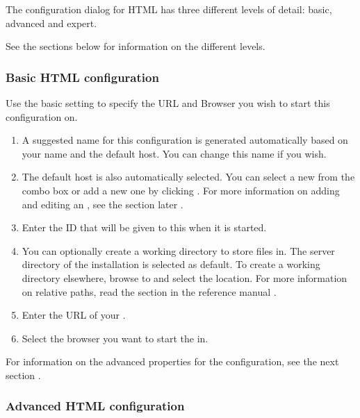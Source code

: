 

The \gdaut{} configuration dialog for HTML has three different levels of detail: basic, advanced and expert. 

See the sections below for information on the different levels. 

\subsubsection{Basic HTML \gdaut{} configuration}

Use the basic setting to specify the URL and Browser you wish to start this \gdaut{} configuration on. 

\begin{enumerate}
\item A suggested name for this \gdaut{} configuration is generated automatically based on your \gdaut{} name and the default \gdagent{} host. You can change this name if you wish. 
\item The default \gdagent host is also automatically selected. You can select a new \gdagent{} from the combo box or add a new one by clicking . For more information on adding and editing an \gdagent{}, see the section later .
\item Enter the \gdaut{} ID that will be given to this \gdaut{} when it is started.  
\item You can optionally create a working directory to store files in. The server directory of the installation is selected as default. To create a working directory elsewhere, browse to and select the location.  For more information on relative paths, read the section in the reference manual . 
\item Enter the URL of your \gdaut{}.
\item Select the browser you want to start the \gdaut{} in.
\end{enumerate}
For information on the advanced properties for the \gdaut{} configuration, see the next section . 

\subsubsection{Advanced HTML \gdaut{} configuration}
\label{AdvancedAUTConfigHTML}

